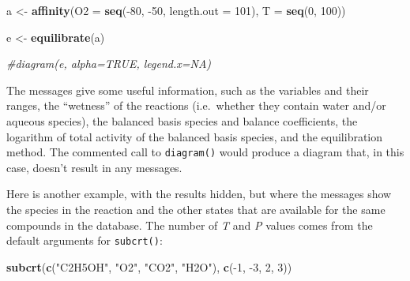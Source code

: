 \documentclass[]{tufte-book}
\newenvironment{Shaded}{}{}
\newcommand{\KeywordTok}[1]{\textcolor[rgb]{0.00,0.44,0.13}{\textbf{#1}}}
\newcommand{\DataTypeTok}[1]{\textcolor[rgb]{0.56,0.13,0.00}{#1}}
\newcommand{\DecValTok}[1]{\textcolor[rgb]{0.25,0.63,0.44}{#1}}
\newcommand{\StringTok}[1]{\textcolor[rgb]{0.25,0.44,0.63}{#1}}
\newcommand{\CommentTok}[1]{\textcolor[rgb]{0.38,0.63,0.69}{\textit{#1}}}
\newcommand{\OperatorTok}[1]{\textcolor[rgb]{0.40,0.40,0.40}{#1}}
\newcommand{\NormalTok}[1]{#1}
\begin{document}
\begin{Shaded}
\begin{Highlighting}[]
\NormalTok{a <-}\StringTok{ }\KeywordTok{affinity}\NormalTok{(}\DataTypeTok{O2 =} \KeywordTok{seq}\NormalTok{(}\OperatorTok{-}\DecValTok{80}\NormalTok{, }\OperatorTok{-}\DecValTok{50}\NormalTok{, }\DataTypeTok{length.out =} \DecValTok{101}\NormalTok{), }\DataTypeTok{T =} \KeywordTok{seq}\NormalTok{(}\DecValTok{0}\NormalTok{, }\DecValTok{100}\NormalTok{))}
\end{Highlighting}
\end{Shaded}

\begin{Shaded}
\begin{Highlighting}[]
\NormalTok{e <-}\StringTok{ }\KeywordTok{equilibrate}\NormalTok{(a)}
\end{Highlighting}
\end{Shaded}

\begin{Shaded}
\begin{Highlighting}[]
\CommentTok{#diagram(e, alpha=TRUE, legend.x=NA)}
\end{Highlighting}
\end{Shaded}

The messages give some useful information, such as the variables and
their ranges, the ``wetness'' of the reactions (i.e.~whether they
contain water and/or aqueous species), the balanced basis species and
balance coefficients, the logarithm of total activity of the balanced
basis species, and the equilibration method. The commented call to
{\texttt{diagram()}} would produce a diagram that, in this case, doesn't
result in any messages.

Here is another example, with the results hidden, but where the messages
show the species in the reaction and the other states that are available
for the same compounds in the database. The number of \emph{T} and
\emph{P} values comes from the default arguments for
{\texttt{subcrt()}}:

\begin{Shaded}
\begin{Highlighting}[]
\KeywordTok{subcrt}\NormalTok{(}\KeywordTok{c}\NormalTok{(}\StringTok{"C2H5OH"}\NormalTok{, }\StringTok{"O2"}\NormalTok{, }\StringTok{"CO2"}\NormalTok{, }\StringTok{"H2O"}\NormalTok{), }\KeywordTok{c}\NormalTok{(}\OperatorTok{-}\DecValTok{1}\NormalTok{, }\OperatorTok{-}\DecValTok{3}\NormalTok{, }\DecValTok{2}\NormalTok{, }\DecValTok{3}\NormalTok{))}
\end{Highlighting}
\end{Shaded}
\end{document}

